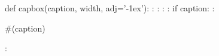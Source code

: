 \date{\today}

\newcommand{\ptikz}[1]{\protect\tikz{\protect #1}}

\newcommand{\BJ}{\ensuremath{\R{SJ}}}
\newcommand{\GS}{\ensuremath{\R{GS}}}
\newcommand{\SGS}{\ensuremath{\R{SGS}}}
\newcommand{\cBJ}{\ensuremath{\R{CJ}}}
\newcommand{\cSGS}{\ensuremath{\R{CSGS}}}
\newcommand{\sBJ}{\ensuremath{\R{GJ($-1$)}}}
\newcommand{\sGS}{\ensuremath{\R{GGS}}}
\newcommand{\sSGS}{\ensuremath{\R{GSGS}}}
\newcommand{\GJ}[1]{\ensuremath{\R{GJ($#1$)}}}
\newcommand{\sSGScg}{\ensuremath{\R{GSGS/CG}}}

\newsavebox{\mybox}
\newlength{\myboxlen}
\python
{%
def capbox(caption, width, adj='-1ex'):
    :
    :\settowidth{\myboxlen}{\usebox{\mybox}}
    :\addtolength{\myboxlen}{#(adj)}
    :\tabcap{\myboxlen}
    if caption:
        :\caption{#(caption)}
    :\usebox{\mybox}
}%
